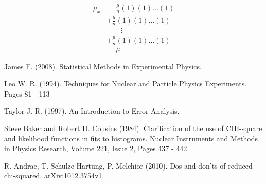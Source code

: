 \documentclass[12pt,a4paper]{report}
\begin{document}
\begin{align*}
\mu_{\bar{x}}
&= \frac{\mu}{n} (1) (1) \dots (1) \\
&+ \frac{\mu}{n} (1) (1) \dots (1) \\
& \qquad \vdots \\
&+ \frac{\mu}{n} (1) (1) \dots (1) \\
&= \mu
\end{align*}

\medskip

\begin{thebibliography}{99}

James F. (2008). Statistical Methods in Experimental Physics.

Leo W. R. (1994). Techniques for Nuclear and Particle Physics Experiments. Pages 81 - 113

Taylor J. R. (1997). An Introduction to Error Analysis. 

Steve Baker and Robert D. Cousins (1984). Clarification of the use of CHI-square and likelihood functions in fits to histograms. Nuclear Instruments and Methods in Physics Research, Volume 221, Issue 2, Pages 437 - 442 

R. Andrae, T. Schulze-Hartung, P. Melchior (2010). Dos and don’ts of reduced chi-squared. arXiv:1012.3754v1. 

\end{thebibliography}
\end{document}
